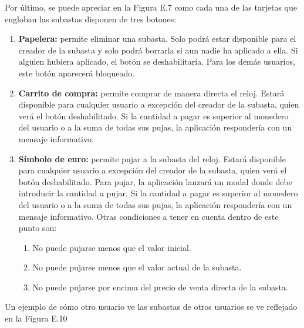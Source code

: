 	Por último, se puede apreciar en la Figura E.7 como cada una de las tarjetas que engloban las subastas disponen de tres botones:
	\begin{enumerate}
		\item \textbf{Papelera:} permite eliminar una subasta. Solo podrá estar disponible para el creador de la subasta y solo podrá borrarla si aun nadie ha aplicado a ella. Si alguien hubiera aplicado, el botón se deshabilitaría. Para los demás usuarios, este botón aparecerá bloqueado.
		\item \textbf{Carrito de compra:} permite comprar de manera directa el reloj. Estará disponible para cualquier usuario a excepción del creador de la subasta, quien verá el botón deshabilitado. Si la cantidad a pagar es superior al monedero del usuario o a la suma de todas sus pujas, la aplicación respondería con un mensaje informativo.
		\item \textbf{Símbolo de euro:} permite pujar a la subasta del reloj. Estará disponible para cualquier usuario a excepción del creador de la subasta, quien verá el botón deshabilitado. Para pujar, la aplicación lanzará un modal donde debe introducir la cantidad a pujar. Si la cantidad a pagar es superior al monedero del usuario o a la suma de todas sus pujas, la aplicación respondería con un mensaje informativo. Otras condiciones a tener en cuenta dentro de este punto son:
		\begin{enumerate}
			\item No puede pujarse menos que el valor inicial.
			\item No puede pujarse menos que el valor actual de la subasta.
			\item No puede pujarse por encima del precio de venta directa de la subasta.
		\end{enumerate}
	\end{enumerate}
	
	Un ejemplo de cómo otro usuario ve las subastas de otros usuarios se ve reflejado en la Figura E.10
	



